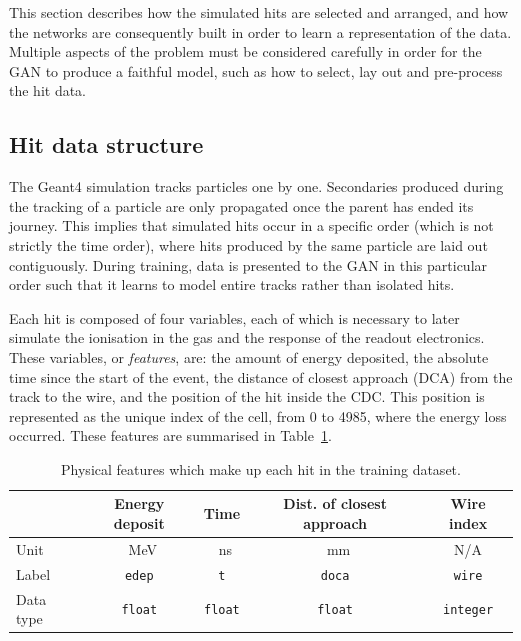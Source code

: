 This section describes how the simulated hits are selected and arranged, and how
the networks are consequently built in order to learn a representation of the
data. Multiple aspects of the problem must be considered carefully in order for
the GAN to produce a faithful model, such as how to select, lay out and
pre-process the hit data.


\subsection{Hit data structure}
\label{sec:hit_data_structure}

The {\sc Geant4} simulation tracks particles one by one. Secondaries
produced during the tracking of a particle are only propagated once the parent
has ended its journey. This implies that simulated hits occur in a specific
order (which is not strictly the time order), where hits produced by the same
particle are laid out contiguously. During training, data is presented to the
GAN in this particular order such that it learns to model entire tracks rather
than isolated hits.

Each hit is composed of four variables, each of which is necessary to later
simulate the ionisation in the gas and the response of the readout electronics.
These variables, or \emph{features}, are: the amount of energy deposited, the
absolute time since the start of the event, the distance of closest approach
(DCA) from the track to the wire, and the position of the hit inside the CDC.
This position is represented as the unique index of the cell, from 0 to 4985, where the energy loss occurred. These features are summarised in
Table~\ref{tab:gan_features}.

\begin{table}
    \setlength{\tabcolsep}{12pt}
    \centering
    \begin{tabular}{l|cccc}
        \toprule
                  & \bfseries Energy deposit & \bfseries Time & \bfseries
                  Dist. of closest approach & \bfseries Wire index \\
        \midrule
        Unit      & \SI{}{\MeV}              & \SI{}{\ns}     & \SI{}{\mm}
        & N/A                  \\
        Label     & \texttt{edep}            & \texttt{t}     & \texttt{doca}
        & \texttt{wire}        \\
        Data type & \texttt{float}           & \texttt{float} & \texttt{float}
        & \texttt{integer} \\\bottomrule
    \end{tabular}
    \caption{Physical features which make up each hit in the training dataset.}
    \label{tab:gan_features}
\end{table}

